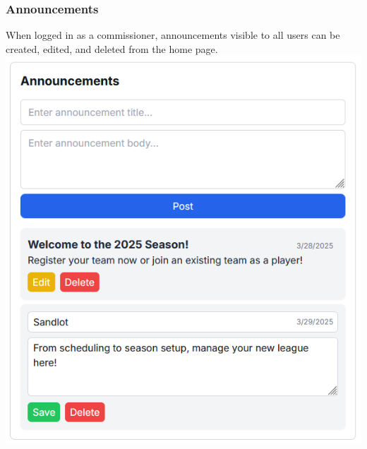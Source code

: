 \documentclass{article}
\begin{document}
            \subsubsection{Announcements}
                When logged in as a commissioner, announcements visible to
                all users can be created, edited, and deleted from the home page.
                \newline \includegraphics[scale=0.6]{announcements.png}
\end{document}
